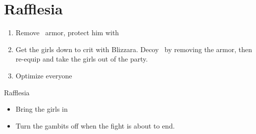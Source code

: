 \chapter{Rafflesia}

\begin{enumerate}
\item Remove \vaan\ armor, protect him with \penelo
\item Get the girls down to crit with Blizzara. Decoy \vaan\ by removing the armor, then re-equip and take the girls out of the party.
\item Optimize everyone
\end{enumerate}
\begin{gambit}
\begin{itemize}
\end{itemize}
\end{gambit}
\begin{battle}{Rafflesia}
\begin{itemize}
\vaanf Run up
\item Bring the girls in
\item Turn the gambits off when the fight is about to end.
\end{itemize}
\end{battle}